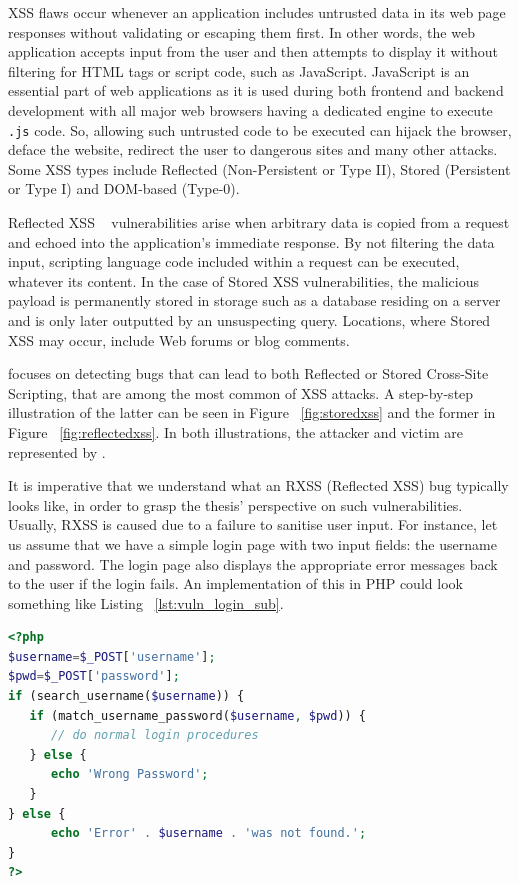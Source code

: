 XSS flaws occur whenever an application includes untrusted data in its web page responses without validating or escaping them first. In other words, the web application accepts input from the user and then attempts to display it without filtering for HTML tags or script code, such as JavaScript. JavaScript is an essential part of web applications as it is used during both frontend and backend development with all major web browsers having a dedicated engine to execute {\tt .js} code. So, allowing such untrusted code to be executed can hijack the browser, deface the website, redirect the user to dangerous sites and many other attacks. Some XSS types include Reflected (Non-Persistent or Type II), Stored (Persistent or Type I) and DOM-based (Type-0).

Reflected XSS ~\cite{rxss_def} vulnerabilities arise when arbitrary data is copied from a request and echoed into the application's immediate response. By not filtering the data input, scripting language code included within a request can be executed, whatever its content. In the case of Stored XSS vulnerabilities, the malicious payload is permanently stored in storage such as a database residing on a server and is only later outputted by an unsuspecting query. Locations, where Stored XSS may occur, include Web forums or blog comments. 

\pname{} focuses on detecting bugs that can lead to both Reflected or Stored Cross-Site Scripting, that are among the most common of XSS attacks. A step-by-step illustration of the latter can be seen in Figure ~\ref{fig:storedxss} and the former in Figure ~\ref{fig:reflectedxss}. In both illustrations, the attacker and victim are represented by \pname{}.

It is imperative that we understand what an RXSS (Reflected XSS) bug typically looks like, in order to grasp the thesis' perspective on such vulnerabilities. Usually, RXSS is caused due to a failure to sanitise user input. For instance, let us assume that we have a simple login page with two input fields: the username and password. The login page also displays the appropriate error messages back to the user if the login fails. An implementation of this in PHP could look something like Listing ~\ref{lst:vuln_login_sub}.

\begin{lstlisting}[aboveskip=\baselineskip, showstringspaces=false, frame=single, language=PHP, caption={\textit{Vulnerable login form}}, numberstyle=\color{gray}, numbersep=5pt, label={lst:vuln_login_sub}]
<?php
$username=$_POST['username'];
$pwd=$_POST['password'];
if (search_username($username)) {
   if (match_username_password($username, $pwd)) {
      // do normal login procedures
   } else {
      echo 'Wrong Password';
   }
} else {
      echo 'Error' . $username . 'was not found.';
}
?>
\end{lstlisting}

